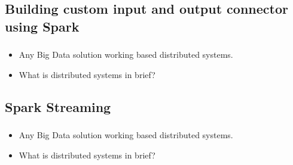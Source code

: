 

\subsection{Building custom input and output connector using Spark}

\begin{frame}
\frametitle{\subsecname}
\begin{itemize}[<+->]
	\item Any Big Data solution working based distributed systems.
	\item What is distributed systems in brief?
\end{itemize}
\end{frame}



\subsection{Spark Streaming}


\begin{frame}
  \frametitle{\subsecname}
	\begin{itemize}[<+->]
		\item Any Big Data solution working based distributed systems.
		\item What is distributed systems in brief?
	\end{itemize}
\end{frame}



